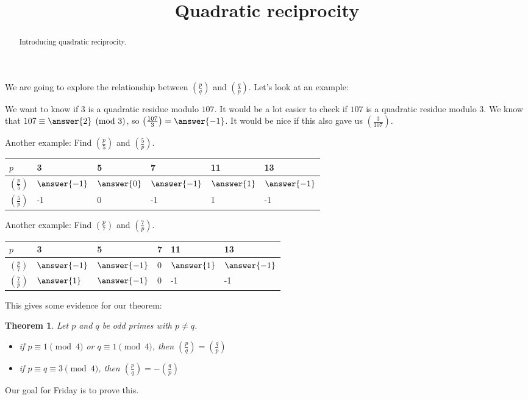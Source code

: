 \documentclass{ximera}
\title{Quadratic reciprocity}
\theoremstyle{plain}
\newtheorem{thm}{Theorem}%
\theoremstyle{definition}
\begin{document}
  
\begin{abstract}  
Introducing quadratic reciprocity.
\end{abstract}  
\maketitle  

We are going to explore the relationship between $\left(\frac{p}{q}\right)$ and $\left(\frac{q}{p}\right)$. Let's look at an example:
\begin{question}
 We want to know if $3$ is a quadratic residue modulo $107$. It would be a lot easier to check if $107$ is a quadratic residue modulo $3$. We know that $107\equiv \answer{2}
 \pmod 3$, so $\left(\frac{107}{3}\right)=\answer{-1}
 $. It would be nice if this also gave us $\left(\frac{3}{107}\right)$.
\end{question}

\begin{question}
 Another example: Find $\left(\frac{p}{5}\right)$ and $\left(\frac{5}{p}\right)$.
 
\begin{tabular}{|l||l|l|l|l|l|}\hline
$p$&3&5&7&11&13\\\hline\hline
$\left(\frac{p}{5}\right)$&$\answer{-1}$&$\answer{0}$&$\answer{-1}$&$\answer{1}$&$\answer{-1}$\\\hline
$\left(\frac{5}{p}\right)$&-1&0&-1&1&-1\\\hline
\end{tabular}
\end{question}

\begin{question}
 Another example: Find $\left(\frac{p}{7}\right)$ and $\left(\frac{7}{p}\right)$.
 
\begin{tabular}{|l||l|l|l|l|l|}\hline
$p$&3&5&7&11&13\\\hline\hline
$\left(\frac{p}{7}\right)$&$\answer{-1}$&$\answer{-1}$&0&$\answer{1}$&$\answer{-1}$\\\hline
$\left(\frac{7}{p}\right)$&$\answer{1}$&$\answer{-1}$&0&-1&-1\\\hline
\end{tabular}
\end{question}

This gives some evidence for our theorem:
\begin{thm}
 Let $p$ and $q$ be odd primes with $p\neq q$. 
\begin{itemize}
 \item if $p\equiv 1 \pmod 4$ or $q\equiv 1 \pmod 4$, then $\left(\frac{p}{q}\right)=\left(\frac{q}{p}\right)$
 \item if $p\equiv q\equiv 3 \pmod 4$, then $\left(\frac{p}{q}\right)=-\left(\frac{q}{p}\right)$
\end{itemize}
\end{thm}

Our goal for Friday is to prove this.
\end{document}
